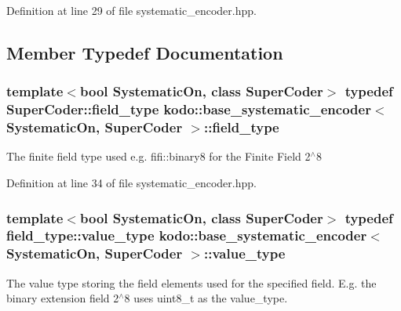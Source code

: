 Definition at line 29 of file systematic\-\_\-encoder.\-hpp.



\subsection{Member Typedef Documentation}
\hypertarget{classkodo_1_1base__systematic__encoder_a15767452364727895710efc393ba58ae}{
\subsubsection[{field\-\_\-type}]{\setlength{\rightskip}{0pt plus 5cm}template$<$bool Systematic\-On, class Super\-Coder$>$ typedef Super\-Coder\-::field\-\_\-type {\bf kodo\-::base\-\_\-systematic\-\_\-encoder}$<$ Systematic\-On, Super\-Coder $>$\-::{\bf field\-\_\-type}}}\label{classkodo_1_1base__systematic__encoder_a15767452364727895710efc393ba58ae}




The finite field type used e.\-g. fifi\-::binary8 for the Finite Field 2$^\wedge$8 

Definition at line 34 of file systematic\-\_\-encoder.\-hpp.

\hypertarget{classkodo_1_1base__systematic__encoder_af12f2b02d4ca393d7728abd7772d2650}{
\subsubsection[{value\-\_\-type}]{\setlength{\rightskip}{0pt plus 5cm}template$<$bool Systematic\-On, class Super\-Coder$>$ typedef field\-\_\-type\-::value\-\_\-type {\bf kodo\-::base\-\_\-systematic\-\_\-encoder}$<$ Systematic\-On, Super\-Coder $>$\-::{\bf value\-\_\-type}}}\label{classkodo_1_1base__systematic__encoder_af12f2b02d4ca393d7728abd7772d2650}




The value type storing the field elements used for the specified field. E.\-g. the binary extension field 2$^\wedge$8 uses uint8\-\_\-t as the value\-\_\-type. 


